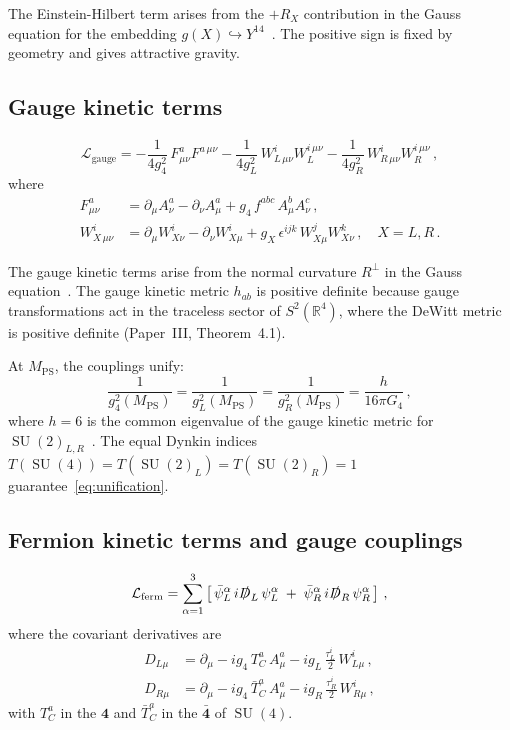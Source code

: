 \documentclass[12pt,a4paper]{article}
\theoremstyle{definition}
\newcommand{\SU}{\operatorname{SU}}
\newcommand{\R}{\mathbb{R}}
\newcommand{\MPS}{M_{\mathrm{PS}}}
\begin{document}
The Einstein-Hilbert term arises from the $+R_X$ contribution in the Gauss equation for the embedding $g(X) \hookrightarrow Y^{14}$~\cite{Paper3}.
The positive sign is fixed by geometry and gives attractive gravity.

\subsection{Gauge kinetic terms}

\begin{equation}
\label{eq:L_gauge}
\mathcal{L}_{\mathrm{gauge}} = -\frac{1}{4g_4^2}\, F^a_{\mu\nu} F^{a\,\mu\nu}
-\frac{1}{4g_L^2}\, W^i_{L\,\mu\nu} W_L^{i\,\mu\nu}
-\frac{1}{4g_R^2}\, W^i_{R\,\mu\nu} W_R^{i\,\mu\nu}\,,
\end{equation}
where
\begin{align}
F^a_{\mu\nu} &= \partial_\mu A^a_\nu - \partial_\nu A^a_\mu + g_4\, f^{abc}\, A^b_\mu A^c_\nu\,, \\
W^i_{X\,\mu\nu} &= \partial_\mu W^i_{X\nu} - \partial_\nu W^i_{X\mu} + g_X\, \epsilon^{ijk}\, W^j_{X\mu} W^k_{X\nu}\,, \quad X = L, R\,.
\end{align}

The gauge kinetic terms arise from the normal curvature $R^\perp$ in the Gauss equation~\cite{Paper3}.
The gauge kinetic metric $h_{ab}$ is positive definite because gauge transformations act in the traceless sector of $S^2(\R^4)$, where the DeWitt metric is positive definite (Paper~III, Theorem~4.1).

At $\MPS$, the couplings unify:
\begin{equation}
\label{eq:unification}
\frac{1}{g_4^2(\MPS)} = \frac{1}{g_L^2(\MPS)} = \frac{1}{g_R^2(\MPS)} = \frac{h}{16\pi G_4}\,,
\end{equation}
where $h = 6$ is the common eigenvalue of the gauge kinetic metric for $\SU(2)_{L,R}$~\cite{Paper3}.
The equal Dynkin indices $T(\SU(4)) = T(\SU(2)_L) = T(\SU(2)_R) = 1$ guarantee~\eqref{eq:unification}.

\subsection{Fermion kinetic terms and gauge couplings}

\begin{equation}
\label{eq:L_ferm}
\mathcal{L}_{\mathrm{ferm}} = \sum_{\alpha=1}^{3} \left[\,
\bar{\psi}^\alpha_L\, i\slashed{D}_L\, \psi^\alpha_L
\;+\;
\bar{\psi}^\alpha_R\, i\slashed{D}_R\, \psi^\alpha_R
\,\right]\,,
\end{equation}
where the covariant derivatives are
\begin{align}
D_{L\mu} &= \partial_\mu - i g_4\, T^a_C\, A^a_\mu - i g_L\, \frac{\tau^i_L}{2}\, W^i_{L\mu}\,, \\
D_{R\mu} &= \partial_\mu - i g_4\, \bar{T}^a_C\, A^a_\mu - i g_R\, \frac{\tau^i_R}{2}\, W^i_{R\mu}\,,
\end{align}
with $T^a_C$ in the $\mathbf{4}$ and $\bar{T}^a_C$ in the $\bar{\mathbf{4}}$ of $\SU(4)$.
\end{document}
